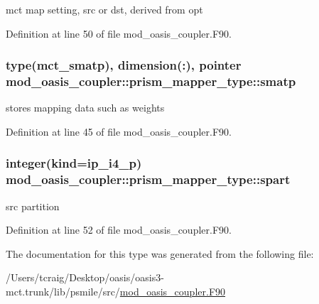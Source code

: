 mct map setting, src or dst, derived from opt 



Definition at line 50 of file mod\+\_\+oasis\+\_\+coupler.\+F90.

\hypertarget{structmod__oasis__coupler_1_1prism__mapper__type_a3dc23fe2df63b9bbf759a2d06645c27e}{
\subsubsection[{smatp}]{\setlength{\rightskip}{0pt plus 5cm}type(mct\+\_\+smatp), dimension(\+:), pointer mod\+\_\+oasis\+\_\+coupler\+::prism\+\_\+mapper\+\_\+type\+::smatp\hspace{0.3cm}{\ttfamily [private]}}}\label{structmod__oasis__coupler_1_1prism__mapper__type_a3dc23fe2df63b9bbf759a2d06645c27e}


stores mapping data such as weights 



Definition at line 45 of file mod\+\_\+oasis\+\_\+coupler.\+F90.

\hypertarget{structmod__oasis__coupler_1_1prism__mapper__type_a57db47c76982ed2bfae82ccc0cf5e350}{
\subsubsection[{spart}]{\setlength{\rightskip}{0pt plus 5cm}integer(kind=ip\+\_\+i4\+\_\+p) mod\+\_\+oasis\+\_\+coupler\+::prism\+\_\+mapper\+\_\+type\+::spart\hspace{0.3cm}{\ttfamily [private]}}}\label{structmod__oasis__coupler_1_1prism__mapper__type_a57db47c76982ed2bfae82ccc0cf5e350}


src partition 



Definition at line 52 of file mod\+\_\+oasis\+\_\+coupler.\+F90.



The documentation for this type was generated from the following file\+:\begin{DoxyCompactItemize}
\item 
/\+Users/tcraig/\+Desktop/oasis/oasis3-\/mct.\+trunk/lib/psmile/src/\hyperlink{mod__oasis__coupler_8_f90}{mod\+\_\+oasis\+\_\+coupler.\+F90}\end{DoxyCompactItemize}
